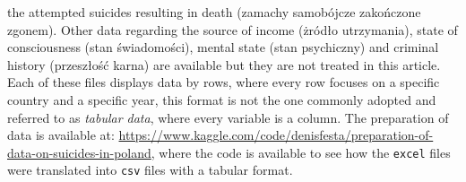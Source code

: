 \documentclass{article}
\begin{document}
the attempted suicides resulting in death (zamachy samobójcze zakończone
zgonem).
Other data regarding the source of income (żródło utrzymania),
state of consciousness (stan świadomości),
mental state (stan psychiczny) and criminal history (przeszłość karna)
are available but they are not treated in this article. \\
Each of these files displays data by rows, where every row focuses on a specific country
and a specific year, this format is not the one commonly adopted and referred to as
\textit{tabular data}, where every variable is a column. 
The preparation of data is available at: 
\url{https://www.kaggle.com/code/denisfesta/preparation-of-data-on-suicides-in-poland},
where the code is available to see how the \texttt{excel} files were translated into 
\texttt{csv} files with a tabular format.
%
%
\end{document}
